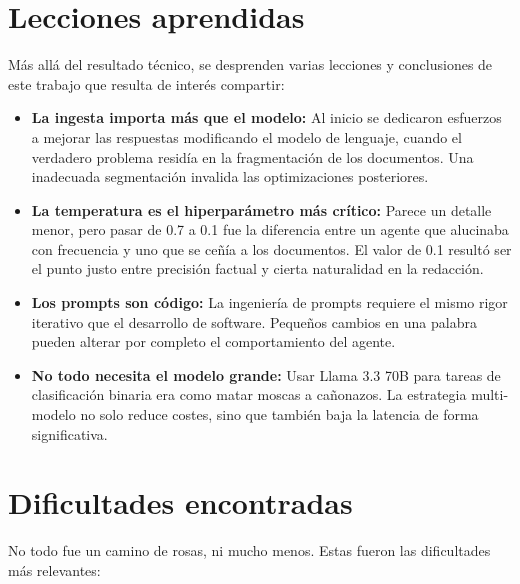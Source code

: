 \documentclass[12pt,a4paper,oneside]{report}
\begin{document}
\section{Lecciones aprendidas}

Más allá del resultado técnico, se desprenden varias lecciones y conclusiones de este trabajo que resulta de interés compartir:

\begin{itemize}
    \item \textbf{La ingesta importa más que el modelo:} Al inicio se dedicaron esfuerzos a mejorar las respuestas modificando el modelo de lenguaje, cuando el verdadero problema residía en la fragmentación de los documentos. Una inadecuada segmentación invalida las optimizaciones posteriores.
    \item \textbf{La temperatura es el hiperparámetro más crítico:} Parece un detalle menor, pero pasar de 0.7 a 0.1 fue la diferencia entre un agente que alucinaba con frecuencia y uno que se ceñía a los documentos. El valor de 0.1 resultó ser el punto justo entre precisión factual y cierta naturalidad en la redacción.
    \item \textbf{Los prompts son código:} La ingeniería de prompts requiere el mismo rigor iterativo que el desarrollo de software. Pequeños cambios en una palabra pueden alterar por completo el comportamiento del agente.
    \item \textbf{No todo necesita el modelo grande:} Usar Llama 3.3 70B para tareas de clasificación binaria era como matar moscas a cañonazos. La estrategia multi-modelo no solo reduce costes, sino que también baja la latencia de forma significativa.
\end{itemize}

\section{Dificultades encontradas}

No todo fue un camino de rosas, ni mucho menos. Estas fueron las dificultades más relevantes:
\end{document}
